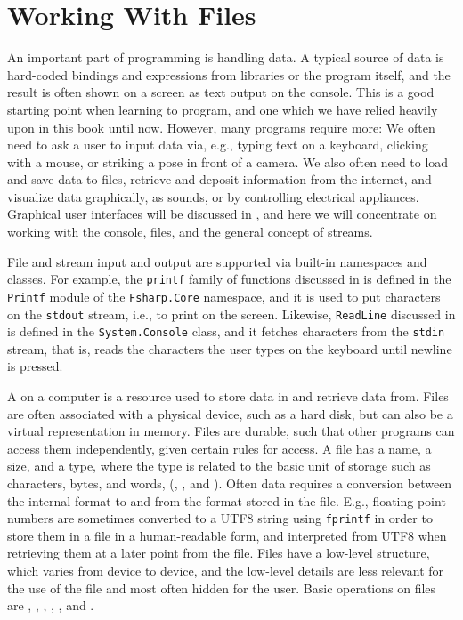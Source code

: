 \documentclass[springer.tex]{subfiles}
\begin{document}
\chapter{Working With Files}
\label{chap:IO}
An important part of programming is handling data. A typical source of data is hard-coded bindings and expressions from libraries or the program itself, and the result is often shown on a screen as text output on the console. This is a good starting point when learning to program, and one which we have relied heavily upon in this book until now. However, many programs require more: We often need to ask a user to input data via, e.g., typing text on a keyboard, clicking with a mouse, or striking a pose in front of a camera. We also often need to load and save data to files, retrieve and deposit information from the internet, and visualize data graphically, as sounds, or by controlling electrical appliances. Graphical user interfaces will be discussed in , and here we will concentrate on working with the console, files, and the general concept of streams.

File and stream input and output are supported via built-in namespaces and classes. For example, the \lstinline!printf! family of functions discussed in  is defined in the \lstinline!Printf! module of the \lstinline!Fsharp.Core! namespace, and it is used to put characters on the \lstinline{stdout} stream, i.e., to print on the screen. Likewise, \lstinline{ReadLine} discussed in  is defined in the \lstinline{System.Console} class, and it fetches characters from the \lstinline{stdin} stream, that is, reads the characters the user types on the keyboard until newline is pressed.

A  on a computer is a resource used to store data in and retrieve data from. Files are often associated with a physical device, such as a hard disk, but can also be a virtual representation in memory. Files are durable, such that other programs can access them independently, given certain rules for access. A file has a name, a size, and a type, where the type is related to the basic unit of storage such as characters, bytes, and words, (, , and ). Often data requires a conversion between the internal format to and from the format stored in the file. E.g., floating point numbers are sometimes converted to a UTF8 string using \lstinline!fprintf! in order to store them in a file in a human-readable form, and interpreted from UTF8 when retrieving them at a later point from the file. Files have a low-level structure, which varies from device to device, and the low-level details are less relevant for the use of the file and most often hidden for the user. Basic operations on files are , , , , , and .
\end{document}
